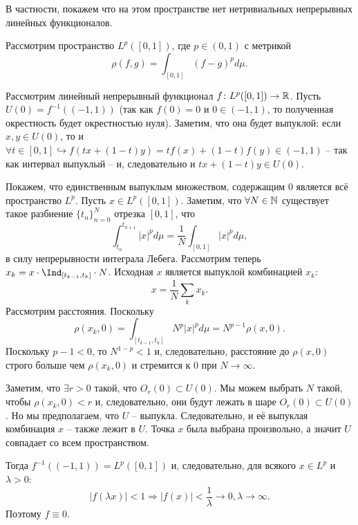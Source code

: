 \begin{example}
    В частности, покажем что на этом пространстве нет нетривиальных непрерывных линейных функционалов.

    Рассмотрим пространство $L^p([0, 1])$, где $p \in (0, 1)$ с метрикой
    \[
        \rho(f, g) = \int_{[0, 1]} (f - g)^p d\mu.
    \]

    Рассмотрим линейный непрерывный функционал $f\colon L^p([0, 1]) \to \mathbb{R}$.
    Пусть $U(0) = f^{-1}((-1, 1))$ (так как $f(0) = 0$ и $0 \in (-1, 1)$, то полученная окрестность будет окрестностью нуля).
    Заметим, что она будет выпуклой: если $x, y \in U(0)$, то и $\forall t \in [0, 1] \hookrightarrow f(tx + (1 - t)y) = t f(x) + (1 - t) f(y) \in (-1, 1)$ -- так как интервал выпуклый -- и, следовательно и $tx + (1 - t)y \in U(0)$.

    Покажем, что единственным выпуклым множеством, содержащим 0 является всё пространство $L^p$.
    Пусть $x \in L^p([0, 1])$.
    Заметим, что $\forall N \in \mathbb{N}$ существует такое разбиение $\{t_n\}_{n = 0}^{N}$ отрезка $[0, 1]$, что
    \[
        \int_{t_n}^{t_{n + 1}} |x|^{p} d\mu = \frac{1}{N} \int_{[0, 1]} |x|^p d\mu,
    \]
    в силу непрерывности интеграла Лебега.
    Рассмотрим теперь $x_k = x \cdot \Ind_{[t_{k - 1}, t_k]} \cdot N$.
    Исходная $x$ является выпуклой комбинацией $x_k\colon$
    \[
        x = \frac{1}{N}\sum_{k} x_k.
    \]
    Рассмотрим расстояния.
    Поскольку
    \[
        \rho(x_k, 0) = \int_{[t_{k - 1}, t_k]} N^p|x|^p d\mu = N^{p - 1} \rho(x, 0).
    \]
    Поскольку $p - 1 < 0$, то $N^{1 - p} < 1$ и, следовательно, расстояние до $\rho(x, 0)$ строго больше чем $\rho(x_k, 0)$ и стремится к 0 при $N \rightarrow \infty$.

    Заметим, что $\exists r > 0$ такой, что $O_r(0) \subset U(0)$.
    Мы можем выбрать $N$ такой, чтобы $\rho(x_k, 0) < r$ и, следовательно, они будут лежать в шаре $O_r(0) \subset U(0)$.
    Но мы предполагаем, что $U$ -- выпукла.
    Следовательно, и её выпуклая комбинация $x$ -- также лежит в $U$.
    Точка $x$ была выбрана произвольно, а значит $U$ совпадает со всем пространством.

    Тогда $f^{-1}((-1, 1)) = L^p([0, 1])$ и, следовательно, для всякого $x \in L^p$ и $\lambda > 0\colon$
    \[
        |f(\lambda x)| < 1 \Rightarrow |f(x)| < \frac{1}{\lambda} \rightarrow 0, \lambda \rightarrow \infty.
    \]
    Поэтому $f \equiv 0$.
\end{example}
